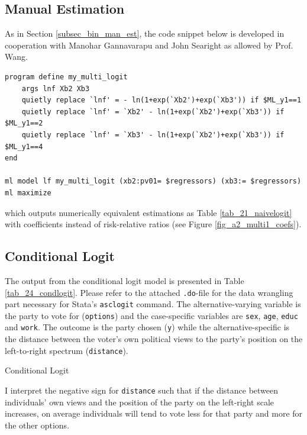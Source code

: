     \begin{samepage}
        \subsection{Manual Estimation}
        As in Section \ref{subsec_bin_man_est}, the code snippet below is developed in cooperation with Manohar Gannavarapu and John Searight as allowed by Prof. Wang.
            \begin{verbatim}
program define my_multi_logit
    args lnf Xb2 Xb3
    quietly replace `lnf' = - ln(1+exp(`Xb2')+exp(`Xb3')) if $ML_y1==1
    quietly replace `lnf' = `Xb2' - ln(1+exp(`Xb2')+exp(`Xb3')) if $ML_y1==2
    quietly replace `lnf' = `Xb3' - ln(1+exp(`Xb2')+exp(`Xb3')) if $ML_y1==4
end

ml model lf my_multi_logit (xb2:pv01= $regressors) (xb3:= $regressors)
ml maximize
            \end{verbatim}
    which outputs numerically equivalent estimations as Table \ref{tab_21_naivelogit} with coefficients instead of risk-relative ratios (see Figure \ref{fig_a2_multi1_coefs}).
    \end{samepage}
    
    
    \subsection{Conditional Logit}
    The output from the conditional logit model is presented in Table \ref{tab_24_condlogit}. Please refer to the attached \texttt{.do}-file for the data wrangling part necessary for Stata's \texttt{asclogit} command. The alternative-varying variable is the party to vote for (\texttt{options}) and the case-specific variables are \texttt{sex}, \texttt{age}, \texttt{educ} and \texttt{work}. The outcome is the party chosen (\texttt{y}) while the alternative-specific is the distance between the voter's own political views to the party’s position on the left-to-right spectrum (\texttt{distance}).
        \begin{samepage}
                \begin{table}[]
                    \footnotesize
                    \centering
                    
                    \caption{Conditional Logit}
                    \label{tab_24_condlogit}
                \end{table}
            \end{samepage}
    \newline\indent
    I interpret the negative sign for \texttt{distance} such that if the distance between individuals' own views and the position of the party on the left-right scale increases, on average individuals will tend to vote less for that party and more for the other options.
    
